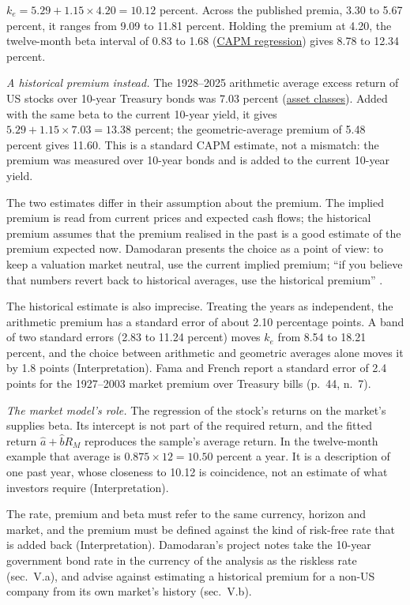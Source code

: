 \begin{qfmethod}
 $k_e=5.29+1.15\times4.20=10.12$ percent. Across the published premia, 3.30 to 5.67 percent, it ranges from 9.09 to 11.81 percent. Holding the premium at 4.20, the twelve-month beta interval of 0.83 to 1.68 (\hyperref[meth:capm-regression]{CAPM regression}) gives 8.78 to 12.34 percent.

\emph{A historical premium instead.} The 1928--2025 arithmetic average excess return of US stocks over 10-year Treasury bonds was 7.03 percent (\hyperref[def:asset-class-characteristics]{asset classes}). Added with the same beta to the current 10-year yield, it gives $5.29+1.15\times7.03=13.38$ percent; the geometric-average premium of 5.48 percent gives 11.60. This is a standard CAPM estimate, not a mismatch: the premium was measured over 10-year bonds and is added to the current 10-year yield.

The two estimates differ in their assumption about the premium. The implied premium is read from current prices and expected cash flows; the historical premium assumes that the premium realised in the past is a good estimate of the premium expected now. Damodaran presents the choice as a point of view: to keep a valuation market neutral, use the current implied premium; ``if you believe that numbers revert back to historical averages, use the historical premium'' \citep[``Project Emails/Information'', sec.~V.b ``Risk Premiums'', read 2026-10-18]{corporate-finance-project-notes}.

The historical estimate is also imprecise. Treating the years as independent, the arithmetic premium has a standard error of about 2.10 percentage points. A band of two standard errors (2.83 to 11.24 percent) moves $k_e$ from 8.54 to 18.21 percent, and the choice between arithmetic and geometric averages alone moves it by 1.8 points (Interpretation). Fama and French report a standard error of 2.4 points for the 1927--2003 market premium over Treasury bills (p.~44, n.~7).

\emph{The market model's role.} The regression of the stock's returns on the market's supplies beta. Its intercept is not part of the required return, and the fitted return $\hat a+\hat bR_M$ reproduces the sample's average return. In the twelve-month example that average is $0.875\times12=10.50$ percent a year. It is a description of one past year, whose closeness to 10.12 is coincidence, not an estimate of what investors require (Interpretation).

 The rate, premium and beta must refer to the same currency, horizon and market, and the premium must be defined against the kind of risk-free rate that is added back (Interpretation). Damodaran's project notes take the 10-year government bond rate in the currency of the analysis as the riskless rate (sec.~V.a), and advise against estimating a historical premium for a non-US company from its own market's history (sec.~V.b).


\end{qfmethod}
